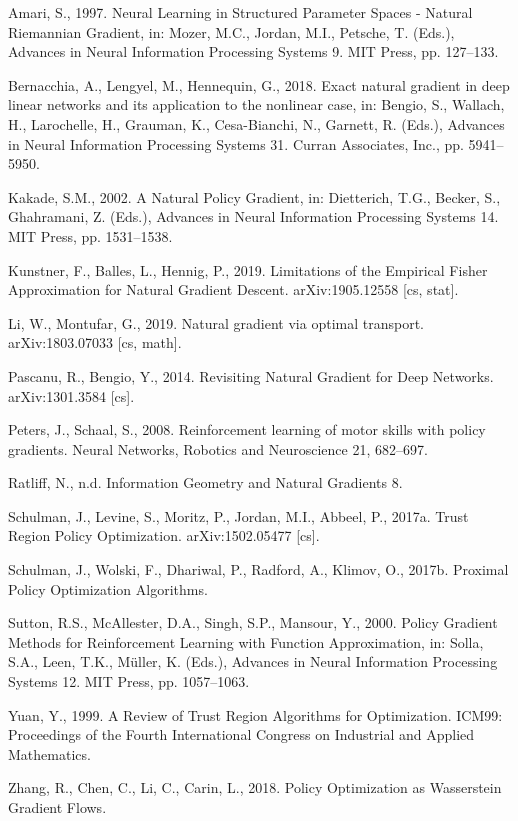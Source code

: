 \documentclass[twoside,10pt]{article}
\newcommand{\subheader}[1]{\bigskip\begin{center}\textbf{#1}\end{center}}
\begin{document}

\begin{thebibliography}{0}

 Amari, S., 1997. Neural Learning in Structured Parameter Spaces - Natural Riemannian Gradient, in: Mozer, M.C., Jordan, M.I., Petsche, T. (Eds.), Advances in Neural Information Processing Systems 9. MIT Press, pp. 127–133.

 Bernacchia, A., Lengyel, M., Hennequin, G., 2018. Exact natural gradient in deep linear networks and its application to the nonlinear case, in: Bengio, S., Wallach, H., Larochelle, H., Grauman, K., Cesa-Bianchi, N., Garnett, R. (Eds.), Advances in Neural Information Processing Systems 31. Curran Associates, Inc., pp. 5941–5950.

 Kakade, S.M., 2002. A Natural Policy Gradient, in: Dietterich, T.G., Becker, S., Ghahramani, Z. (Eds.), Advances in Neural Information Processing Systems 14. MIT Press, pp. 1531–1538.

 Kunstner, F., Balles, L., Hennig, P., 2019. Limitations of the Empirical Fisher Approximation for Natural Gradient Descent. arXiv:1905.12558 [cs, stat].

 Li, W., Montufar, G., 2019. Natural gradient via optimal transport. arXiv:1803.07033 [cs, math].

 Pascanu, R., Bengio, Y., 2014. Revisiting Natural Gradient for Deep Networks. arXiv:1301.3584 [cs].

 Peters, J., Schaal, S., 2008. Reinforcement learning of motor skills with policy gradients. Neural Networks, Robotics and Neuroscience 21, 682–697.

 Ratliﬀ, N., n.d. Information Geometry and Natural Gradients 8.

 Schulman, J., Levine, S., Moritz, P., Jordan, M.I., Abbeel, P., 2017a. Trust Region Policy Optimization. arXiv:1502.05477 [cs].

 Schulman, J., Wolski, F., Dhariwal, P., Radford, A., Klimov, O., 2017b. Proximal Policy Optimization Algorithms.

 Sutton, R.S., McAllester, D.A., Singh, S.P., Mansour, Y., 2000. Policy Gradient Methods for Reinforcement Learning with Function Approximation, in: Solla, S.A., Leen, T.K., Müller, K. (Eds.), Advances in Neural Information Processing Systems 12. MIT Press, pp. 1057–1063.

 Yuan, Y., 1999. A Review of Trust Region Algorithms for Optimization. ICM99: Proceedings of the Fourth International Congress on Industrial and Applied Mathematics.

 Zhang, R., Chen, C., Li, C., Carin, L., 2018. Policy Optimization as Wasserstein Gradient Flows.

\end{thebibliography}
\newpage
\end{document}
